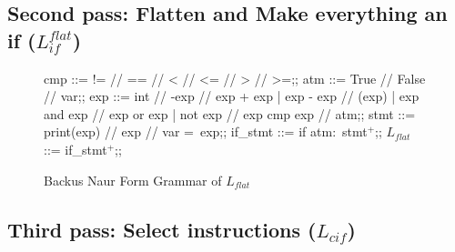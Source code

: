 \lipsum[2-3]

\subsection{Second pass: Flatten and Make everything an if ($L_{if}^{flat}$)}
\begin{figure}[h!]
	\centering
	\begin{bnf}[row{-} = {bg = gray9}]
		cmp ::= != // == // < // <= // > // >=;;
		atm ::= True // False // var;;
		exp ::= int  // -exp // exp + exp 
		| exp - exp // (exp)
		| exp and exp // exp or exp 
		| not exp // exp cmp exp // atm;;
		stmt ::= print(exp) // exp // var = exp;;
		if\_stmt ::= if atm$\colon$ stmt$^+$;;
		$L_{flat}$ ::= if\_stmt$^+$;;
	\end{bnf}
	\caption{Backus Naur Form Grammar of $L_{flat}$}
	\label{flat}
\end{figure}

\lipsum[2-3]

\subsection{Third pass: Select instructions ($L_{cif}$)}

\lipsum[2-3]
